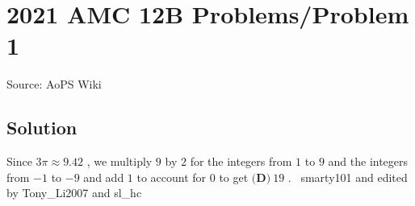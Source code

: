 \documentclass[12pt]{article}
\begin{document}
\section*{{2021 AMC 12B Problems/Problem 1}}
Source: AoPS Wiki

\subsection*{Solution}
Since $3\pi\approx9.42$ , we multiply $9$ by $2$ for the integers from $1$ to $9$ and the integers from $-1$ to $-9$ and add $1$ to account for $0$ to get $\boxed{\textbf{(D)} ~19}$ . ~smarty101 and edited by Tony_Li2007 and sl_hc
\end{document}
